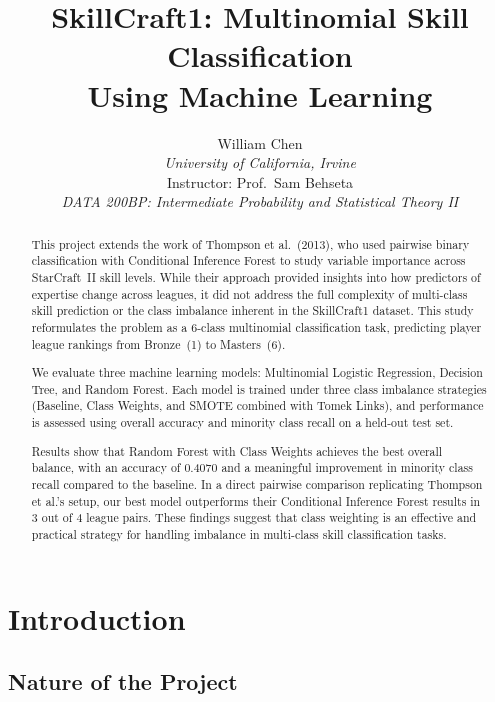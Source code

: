 \documentclass[12pt, a4paper]{article}
\title{
    \vspace{-1cm}
    \Large\textbf{SkillCraft1: Multinomial Skill Classification\\Using Machine Learning}
}
\author{
    William Chen\\
    \textit{University of California, Irvine}\\
    Instructor: Prof.\ Sam Behseta\\
    \textit{DATA 200BP: Intermediate Probability and Statistical Theory II}
}
\date{}
\begin{document}
\maketitle
\thispagestyle{empty}

\begin{abstract}
This project extends the work of Thompson et al.\ (2013), who used pairwise binary
classification with Conditional Inference Forest to study variable importance across
StarCraft~II skill levels. While their approach provided insights into how predictors
of expertise change across leagues, it did not address the full complexity of multi-class
skill prediction or the class imbalance inherent in the SkillCraft1 dataset. This study
reformulates the problem as a 6-class multinomial classification task, predicting player
league rankings from Bronze~(1) to Masters~(6).

We evaluate three machine learning models: Multinomial Logistic Regression, Decision Tree, and Random Forest. Each model is trained under three class imbalance strategies (Baseline, Class Weights, and SMOTE combined with Tomek Links), and performance is assessed using overall accuracy and minority class recall on a held-out test set.

Results show that Random Forest with Class Weights achieves the best overall balance,
with an accuracy of 0.4070 and a meaningful improvement in minority class recall
compared to the baseline. In a direct pairwise comparison replicating Thompson et al.'s
setup, our best model outperforms their Conditional Inference Forest results in 3 out
of 4 league pairs. These findings suggest that class weighting is an effective and
practical strategy for handling imbalance in multi-class skill classification tasks.
\end{abstract}

\newpage
\tableofcontents
\newpage

\section{Introduction}

\subsection{Nature of the Project}
\end{document}
